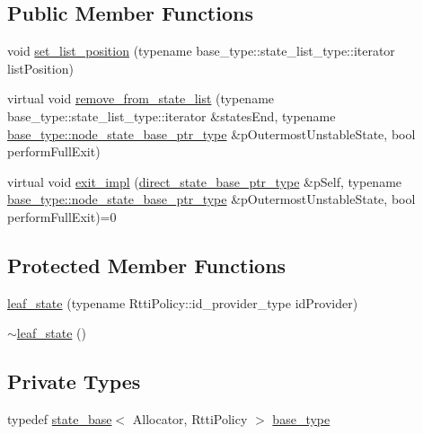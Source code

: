 \subsection*{Public Member Functions}
\begin{DoxyCompactItemize}
\item 
void \mbox{\hyperlink{classboost_1_1statechart_1_1detail_1_1leaf__state_a01ee6156bd6db979c04948260c587131}{set\+\_\+list\+\_\+position}} (typename base\+\_\+type\+::state\+\_\+list\+\_\+type\+::iterator list\+Position)
\item 
virtual void \mbox{\hyperlink{classboost_1_1statechart_1_1detail_1_1leaf__state_ad4f87bfe7bc7c28fa0f486ed13ae3500}{remove\+\_\+from\+\_\+state\+\_\+list}} (typename base\+\_\+type\+::state\+\_\+list\+\_\+type\+::iterator \&states\+End, typename \mbox{\hyperlink{classboost_1_1statechart_1_1detail_1_1state__base_a8e3dd0f80bf95d7df21417a50f1dbaa1}{base\+\_\+type\+::node\+\_\+state\+\_\+base\+\_\+ptr\+\_\+type}} \&p\+Outermost\+Unstable\+State, bool perform\+Full\+Exit)
\item 
virtual void \mbox{\hyperlink{classboost_1_1statechart_1_1detail_1_1leaf__state_af46d30ecf74bf749d1f43c2bb62f1073}{exit\+\_\+impl}} (\mbox{\hyperlink{classboost_1_1statechart_1_1detail_1_1leaf__state_a50634727a16fd74c39340410b1e8217d}{direct\+\_\+state\+\_\+base\+\_\+ptr\+\_\+type}} \&p\+Self, typename \mbox{\hyperlink{classboost_1_1statechart_1_1detail_1_1state__base_a8e3dd0f80bf95d7df21417a50f1dbaa1}{base\+\_\+type\+::node\+\_\+state\+\_\+base\+\_\+ptr\+\_\+type}} \&p\+Outermost\+Unstable\+State, bool perform\+Full\+Exit)=0
\end{DoxyCompactItemize}
\subsection*{Protected Member Functions}
\begin{DoxyCompactItemize}
\item 
\mbox{\hyperlink{classboost_1_1statechart_1_1detail_1_1leaf__state_aa95950d20e977b784863b3ec80d01625}{leaf\+\_\+state}} (typename Rtti\+Policy\+::id\+\_\+provider\+\_\+type id\+Provider)
\item 
\mbox{\hyperlink{classboost_1_1statechart_1_1detail_1_1leaf__state_a5977626aab7b2d602f674dc5362d9db3}{$\sim$leaf\+\_\+state}} ()
\end{DoxyCompactItemize}
\subsection*{Private Types}
\begin{DoxyCompactItemize}
\item 
typedef \mbox{\hyperlink{classboost_1_1statechart_1_1detail_1_1state__base}{state\+\_\+base}}$<$ Allocator, Rtti\+Policy $>$ \mbox{\hyperlink{classboost_1_1statechart_1_1detail_1_1leaf__state_af4aaeff71edcd85f0416b793157de5a6}{base\+\_\+type}}
\end{DoxyCompactItemize}

